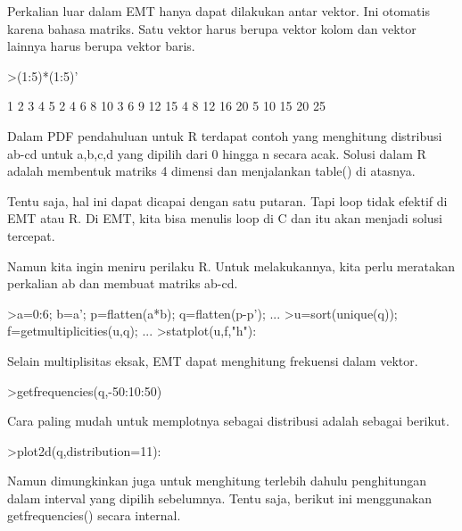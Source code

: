 \documentclass[a4paper,10pt]{article}
\begin{document}
\begin{eulernotebook}
\begin{eulercomment}
\begin{eulercomment}
\begin{eulercomment}
Perkalian luar dalam EMT hanya dapat dilakukan antar vektor. Ini
otomatis karena bahasa matriks. Satu vektor harus berupa vektor kolom
dan vektor lainnya harus berupa vektor baris.
\end{eulercomment}
\begin{eulerprompt}
>(1:5)*(1:5)'
\end{eulerprompt}
\begin{euleroutput}
          1         2         3         4         5 
          2         4         6         8        10 
          3         6         9        12        15 
          4         8        12        16        20 
          5        10        15        20        25 
\end{euleroutput}
\begin{eulercomment}
Dalam PDF pendahuluan untuk R terdapat contoh yang menghitung
distribusi ab-cd untuk a,b,c,d yang dipilih dari 0 hingga n secara
acak. Solusi dalam R adalah membentuk matriks 4 dimensi dan
menjalankan table() di atasnya.

Tentu saja, hal ini dapat dicapai dengan satu putaran. Tapi loop tidak
efektif di EMT atau R. Di EMT, kita bisa menulis loop di C dan itu
akan menjadi solusi tercepat.

Namun kita ingin meniru perilaku R. Untuk melakukannya, kita perlu
meratakan perkalian ab dan membuat matriks ab-cd.
\end{eulercomment}
\begin{eulerprompt}
>a=0:6; b=a'; p=flatten(a*b); q=flatten(p-p'); ...
>u=sort(unique(q)); f=getmultiplicities(u,q); ...
>statplot(u,f,"h"):
\end{eulerprompt}
\begin{eulercomment}
Selain multiplisitas eksak, EMT dapat menghitung frekuensi dalam
vektor.
\end{eulercomment}
\begin{eulerprompt}
>getfrequencies(q,-50:10:50)
\end{eulerprompt}
\begin{euleroutput}
  [0,  23,  132,  316,  602,  801,  333,  141,  53,  0]
\end{euleroutput}
\begin{eulercomment}
Cara paling mudah untuk memplotnya sebagai distribusi adalah sebagai
berikut.
\end{eulercomment}
\begin{eulerprompt}
>plot2d(q,distribution=11):
\end{eulerprompt}
\begin{eulercomment}
Namun dimungkinkan juga untuk menghitung terlebih dahulu penghitungan
dalam interval yang dipilih sebelumnya. Tentu saja, berikut ini
menggunakan getfrequencies() secara internal.


\end{eulercomment}
\end{eulercomment}
\end{eulercomment}
\end{eulernotebook}
\end{document}
